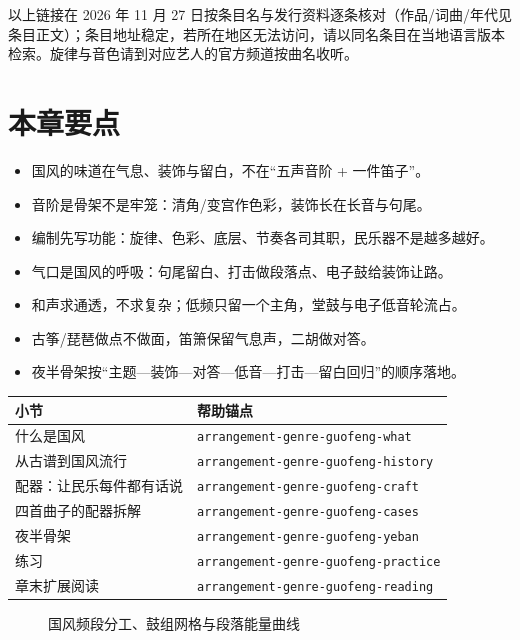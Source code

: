 以上链接在 2026 年 11 月 27 日按条目名与发行资料逐条核对（作品/词曲/年代见条目正文）；条目地址稳定，若所在地区无法访问，请以同名条目在当地语言版本检索。旋律与音色请到对应艺人的官方频道按曲名收听。

\section{本章要点}
\label{sec:guofeng-takeaways}

\begin{itemize}
\item 国风的味道在气息、装饰与留白，不在“五声音阶 + 一件笛子”。
\item 音阶是骨架不是牢笼：清角/变宫作色彩，装饰长在长音与句尾。
\item 编制先写功能：旋律、色彩、底层、节奏各司其职，民乐器不是越多越好。
\item 气口是国风的呼吸：句尾留白、打击做段落点、电子鼓给装饰让路。
\item 和声求通透，不求复杂；低频只留一个主角，堂鼓与电子低音轮流占。
\item 古筝/琵琶做点不做面，笛箫保留气息声，二胡做对答。
\item 夜半骨架按“主题—装饰—对答—低音—打击—留白回归”的顺序落地。
\end{itemize}

\begin{helpmapping}
\begin{longtable}{p{}p{}}
\toprule
小节 & 帮助锚点 \\
\midrule
什么是国风 & \texttt{arrangement-genre-guofeng-what} \\
从古谱到国风流行 & \texttt{arrangement-genre-guofeng-history} \\
配器：让民乐每件都有话说 & \texttt{arrangement-genre-guofeng-craft} \\
四首曲子的配器拆解 & \texttt{arrangement-genre-guofeng-cases} \\
夜半骨架 & \texttt{arrangement-genre-guofeng-yeban} \\
练习 & \texttt{arrangement-genre-guofeng-practice} \\
章末扩展阅读 & \texttt{arrangement-genre-guofeng-reading} \\
\bottomrule
\end{longtable}
\end{helpmapping}

\begin{figure}[htbp]\centering
{}
\caption{国风频段分工、鼓组网格与段落能量曲线}
\end{figure}
